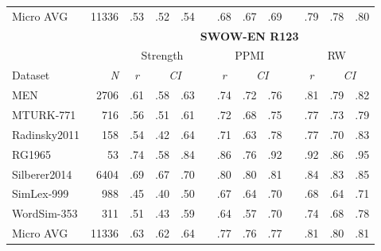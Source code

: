 \documentclass[a4paper,doc,natbib,floatsintext]{apa6}
\begin{document}
\begin{appendix}
\begin{table}
\begin{center}
\begin{small}
\begin{tabular}{@{}lrccclccccccc@{}}
\cmidrule(lr){3-5} \cmidrule(lr){7-9} \cmidrule(l){11-13}
Micro AVG       & 11336& .53 & .52 & .54 &  & .68 & .67 & .69 &  & .79 & .78 & .80 \\
 & \multicolumn{1}{l}{} & \multicolumn{11}{c}{\textbf{SWOW-EN R123}} \\ \cmidrule(l){3-13}
 & \multicolumn{1}{l}{} & \multicolumn{3}{c}{Strength} &  & \multicolumn{3}{c}{PPMI} & \multicolumn{1}{l}{} & \multicolumn{3}{c}{RW} \\ \cmidrule(lr){3-5} \cmidrule(lr){7-9} \cmidrule(l){11-13}
Dataset & \textit{N} & \textit{r} & \multicolumn{2}{c}{\textit{CI}} & \multicolumn{1}{c}{\textit{}} & \textit{r} & \multicolumn{2}{c}{\textit{CI}} & \textit{} & \textit{r} & \multicolumn{2}{c}{\textit{CI}} \\
\cmidrule(lr){3-5} \cmidrule(lr){7-9} \cmidrule(l){11-13}
MEN	 			& 2706	 & .61	 & .58	 & .63	 & \multicolumn{1}{c}{}	 & .74	 & .72	 & .76	 & 	 & .81	 & .79	 & .82 \\
MTURK-771	 	& 716	 & .56	 & .51	 & .61	 & \multicolumn{1}{c}{}	 & .72	 & .68	 & .75	 & 	 & .77	 & .73	 & .79 \\
Radinsky2011	& 158	 & .54	 & .42	 & .64	 & \multicolumn{1}{c}{}	 & .71	 & .63	 & .78	 & 	 & .77	 & .70	 & .83 \\
RG1965	 		& 53	 & .74	 & .58	 & .84	 & \multicolumn{1}{c}{}	 & .86	 & .76	 & .92	 & 	 & .92	 & .86	 & .95 \\
Silberer2014	& 6404	 & .69	 & .67	 & .70	 & \multicolumn{1}{c}{}	 & .80	 & .80	 & .81	 & 	 & .84	 & .83	 & .85 \\
SimLex-999	 	& 988	 & .45	 & .40	 & .50	 & \multicolumn{1}{c}{}	 & .67	 & .64	 & .70	 & 	 & .68	 & .64	 & .71 \\
WordSim-353	 	& 311	 & .51	 & .43	 & .59	 & \multicolumn{1}{c}{}	 & .64	 & .57	 & .70	 & 	 & .74	 & .68	 & .78 \\
\cmidrule(lr){3-5} \cmidrule(lr){7-9} \cmidrule(l){11-13}
Micro AVG       & 11336& .63 & .62& .64 &  & .77 & .76 & .77&  & .81 & .80 & .81\\
\bottomrule
\end{tabular}
\end{small}
\end{center}
\end{table}


\end{appendix}
\end{document}
